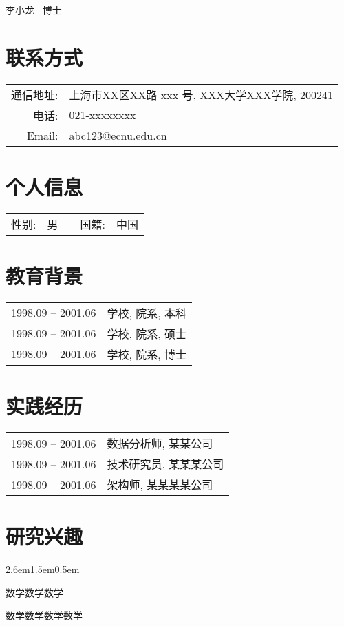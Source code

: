 \documentclass[11pt,a4paper]{ctexart}
\newenvironment{blist}%
    {\begin{list}{{\hfill\raisebox{1.12pt}{$\bullet$}}}{%
     \leftmargin2.6em\labelwidth1.5em\labelsep0.5em
     \itemsep3pt\itemindent0pt\parsep0pt\topsep0pt}}
    {\end{list}}
\newcommand{\Name}[1]{{\color{blue}\yahei\LARGE #1}}
\newcommand{\Title}[1]{{\ \songti\large #1}}
\begin{document}
\noindent
\Name{李小龙}
\Title{博士}\bigskip 

\section{联系方式}
\begin{tabular}{rl}
  通信地址:  & 上海市XX区XX路 xxx 号, XXX大学XXX学院, 200241\\
  电话:      & 021-xxxxxxxx \\
  Email:     & abc123@ecnu.edu.cn 
\end{tabular}


\section{个人信息}
\begin{tabular}{rllrl}
  性别:& 男 & \hspace{2cm}   &   国籍: & 中国
\end{tabular}


\section{教育背景}
\begin{tabular}{ll}
  1998.09 -- 2001.06 & 学校, 院系, 本科 \\
  1998.09 -- 2001.06 & 学校, 院系, 硕士 \\
  1998.09 -- 2001.06 & 学校, 院系, 博士
\end{tabular}


\section{实践经历}
\begin{tabular}{ll}
  1998.09 -- 2001.06 & 数据分析师, 某某公司 \\
  1998.09 -- 2001.06 & 技术研究员, 某某某公司\\
  1998.09 -- 2001.06 & 架构师, 某某某某公司
\end{tabular} 


\section{研究兴趣}
\begin{blist}
  \item 数学数学数学
  \item 数学数学数学数学
\end{blist}
\end{document}
